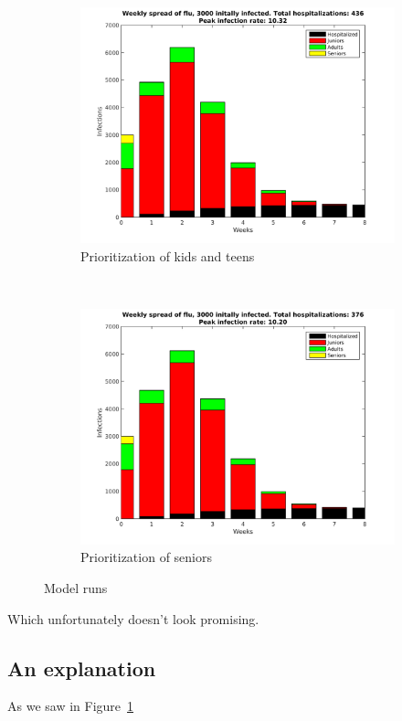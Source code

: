\documentclass{article}
\begin{document}
\begin{figure}
\begin{subfigure}[b]{0.5\textwidth}
		\centering
		\includegraphics[width=\textwidth]{figures/Weekly-juniors.png}
		\caption{Prioritization of kids and teens}
	\end{subfigure}~
	\begin{subfigure}[b]{0.5\textwidth}
		\centering
		\includegraphics[width=\textwidth]{figures/Weekly-seniors.png}
		\caption{Prioritization of seniors}
	\end{subfigure}
	\caption{Model runs}
	\label{fig:modelout}
\end{figure}

Which unfortunately doesn't look promising.

\subsection{An explanation}
As we saw in Figure~\ref{fig:modelout}
\end{document}
